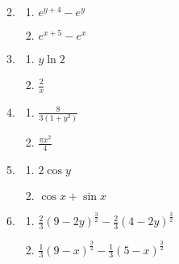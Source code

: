 \begin{enumerate}
\begin{enumerate}[label*=\arabic*.]
\begin{multicols}{2}
            \end{multicols}
        \item \begin{multicols}{2}
                    \begin{enumerate}[label=(\alph*)]
                        \item ${e^{y+4}-e^y}$
                        \item ${e^{x+5}-e^x}$
                    \end{enumerate}
            \end{multicols}
        \item \begin{multicols}{2}
                    \begin{enumerate}[label=(\alph*)]
                        \item ${y\ln 2}$
                        \item ${\frac{2}{x}}$
                    \end{enumerate}
            \end{multicols}
        \item \begin{multicols}{2}
                    \begin{enumerate}[label=(\alph*)]
                        \item ${\frac{8}{3\left(1+y^2\right)}}$
                        \item ${\frac{\pi x^2}{4}}$
                    \end{enumerate}
            \end{multicols}
        \item \begin{multicols}{2}
                    \begin{enumerate}[label=(\alph*)]
                        \item ${2\cos y}$
                        \item ${\cos x + \sin x}$
                    \end{enumerate}
            \end{multicols}
        \item \begin{multicols}{2}
                    \begin{enumerate}[label=(\alph*)]
                        \item ${\frac{2}{3}\left(9 - 2 y\right)^{\frac{3}{2}} - \frac{2}{3}\left(4 - 2 y\right)^{\frac{3}{2}}}$
                        \item ${\frac{1}{3}\left(9 - x\right)^{\frac{3}{2}} - \frac{1}{3}\left(5 - x\right)^{\frac{3}{2}}}$

\end{enumerate}
\end{multicols}
\end{enumerate}
\end{enumerate}
